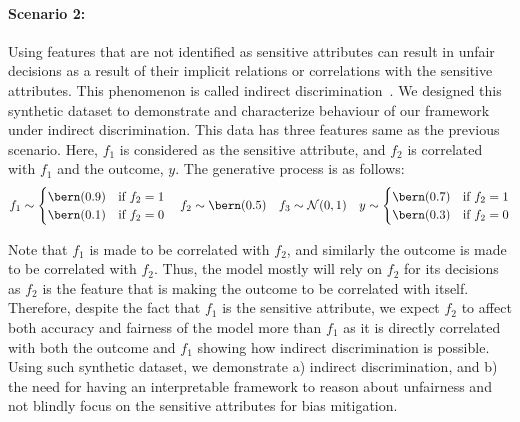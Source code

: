 \paragraph{Scenario 2:} Using features that are not identified as sensitive attributes can result in unfair decisions as a result of their implicit relations or correlations with the sensitive attributes. This phenomenon is called indirect discrimination~\cite{zliobaite2015survey,6175897,ijcai2017-549}. We designed this synthetic dataset to demonstrate and characterize behaviour of our framework under indirect discrimination. This data has three features same as the previous scenario. Here,  $f_1$ is considered as the sensitive attribute, and $f_2$ is correlated with $f_1$ and the outcome, $y$. The generative process is as follows:
\begin{equation*}
    f_1\sim \begin{cases}
        \bern(0.9) & \text{if } f_2=1\\
        \bern(0.1) & \text{if } f_2=0
    \end{cases}
    \quad f_2\sim\bern(0.5)
    \quad f_3\sim \mathcal N (0,1)
    \quad y\sim \begin{cases}
        \bern(0.7) & \text{if } f_2=1\\
        \bern(0.3) & \text{if } f_2=0
    \end{cases}
\end{equation*}

Note that $f_1$ is made to be correlated with $f_2$, and similarly the outcome is made to be correlated with $f_2$. Thus, the model mostly will rely on $f_2$ for its decisions as $f_2$ is the feature that is making the outcome to be correlated with itself. Therefore, despite the fact that $f_1$ is the sensitive attribute, we expect $f_2$ to affect both accuracy and fairness of the model more than $f_1$ as it is directly correlated with both the outcome and $f_1$ showing how indirect discrimination is possible. Using such synthetic dataset, we demonstrate a) indirect discrimination, and b) the need for having an interpretable framework to reason about unfairness and not blindly focus on the sensitive attributes for bias mitigation.


